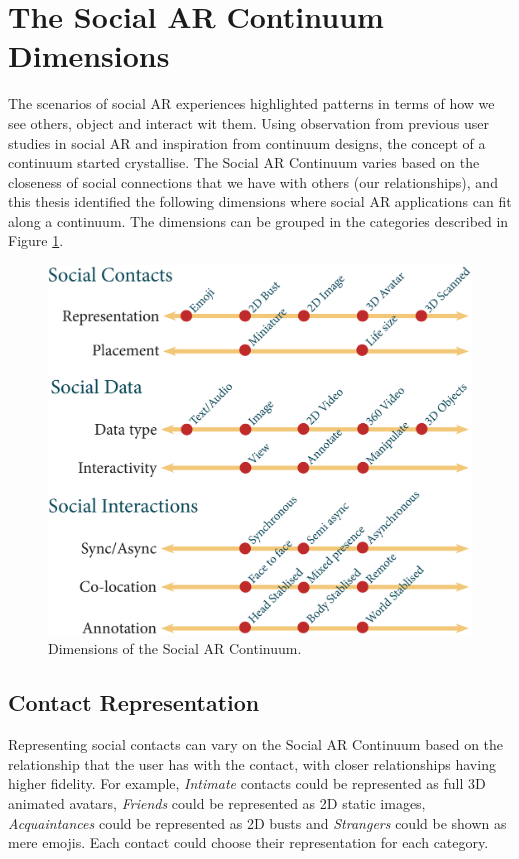 \section{The Social AR Continuum Dimensions}

The scenarios of social AR experiences highlighted patterns in terms of how we see others, object and interact wit them. 
Using observation from previous user studies in social AR and inspiration from continuum designs, the concept of a continuum started crystallise. 
The Social AR Continuum varies based on the closeness of social connections that we have with others (our relationships), and this thesis identified the following dimensions where social AR applications can fit along a continuum. The dimensions can be grouped in the categories described in Figure \ref{fig:continuum:dimensions}.

\begin{figure}[h]
    \centering
    \includegraphics[width=0.8\linewidth]{images/continuum4_1.eps}
    \caption{Dimensions of the Social AR Continuum.}
    \label{fig:continuum:dimensions}
\end{figure}

\subsection{Contact Representation}

Representing social contacts can vary on the Social AR Continuum based on the relationship that the user has with the contact, with closer relationships having higher fidelity. For example, \textit{Intimate} contacts could be represented as full 3D animated avatars, \textit{Friends} could be represented as 2D static images, \textit{Acquaintances} could be represented as 2D busts and \textit{Strangers} could be shown as mere emojis. Each contact could choose their representation for each category.

